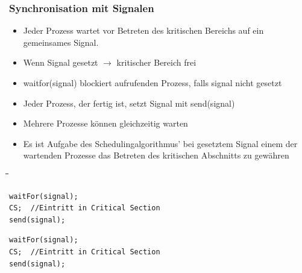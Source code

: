 \subsubsection{Synchronisation mit Signalen}
\begin{itemize}
  \item Jeder Prozess wartet vor Betreten des kritischen Bereichs auf ein
  gemeinsames Signal.
  \item Wenn Signal gesetzt $\rightarrow$ kritischer Bereich frei
  \item waitfor(signal) blockiert aufrufenden Prozess, falls signal nicht
  gesetzt
  \item Jeder Prozess, der fertig ist, setzt Signal mit send(signal)
  \item Mehrere Prozesse können gleichzeitig warten
  \item Es ist Aufgabe des Schedulingalgorithmus' bei gesetztem Signal einem der wartenden Prozesse das Betreten des kritischen Abschnitts zu gewähren
\end{itemize}

\begin{tabbing}
  \hspace*{1cm}\=\hspace*{4.2cm}\=\hspace*{3cm}\=\hspace*{2.7cm}\= \kill
   \> \> \\
  \>\begin{lstlisting}[style=C]
waitFor(signal);
CS;  //Eintritt in Critical Section
send(signal);
    \end{lstlisting} \> \> \>
    \begin{lstlisting}[style=C]
waitFor(signal);
CS;  //Eintritt in Critical Section
send(signal);
    \end{lstlisting} \\\\
 \end{tabbing}
 \vspace*{-1.5cm}

